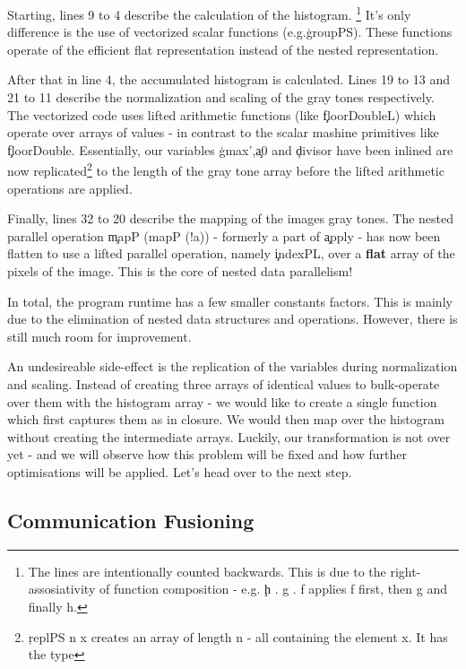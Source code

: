       Starting, lines 9 to 4 describe the calculation of the histogram.
      \footnote[1]{The lines are intentionally counted backwards. This is due to the right-assosiativity of function composition - e.g. \c{h . g . f} applies f first, then g and finally h.}
      It's only difference is the use of vectorized scalar functions (e.g.\c{groupPS}). These functions operate of the efficient flat
      representation instead of the nested representation.
      
      
      After that in line 4, the accumulated histogram is calculated. Lines 19 to 13 and 21 to 11
      describe the normalization and scaling of the gray tones respectively. The vectorized code uses
      lifted arithmetic functions (like \c{floorDoubleL}) which operate over arrays of values - in contrast to
      the scalar mashine primitives like \c{floorDouble}. Essentially, our variables \c{gmax'},\c{a0} and \c{divisor}
      have been inlined are now replicated\footnote[2]{\c{replPS n x} creates an array of length n - all containing the element x. It has the type }
      to the length of the gray tone array before the lifted arithmetic operations are applied.
      
      
      Finally, lines 32 to 20 describe the mapping of the images gray tones.
      The nested parallel operation \c{mapP (mapP (!a))} - formerly a part of \c{apply} - 
      has now been flatten to use a lifted parallel operation, namely \c{indexPL}, over a \textbf{flat} array of
      the pixels of the image. This is the core of nested data parallelism!
      
      In total, the program runtime has a few smaller constants factors. This is mainly due to the elimination of nested data structures
      and operations. However, there is still much room for improvement.
      
      An undesireable side-effect
      is the replication of the variables during normalization and scaling. Instead of creating three arrays of identical values
      to bulk-operate over them with the histogram array - we would like to create a single function which first
      captures them as in closure. We would then map over the histogram without creating the intermediate arrays.
      Luckily, our transformation is not over yet - and we will observe how this problem will be fixed and how further optimisations will be applied.
      Let's head over to the next step.
      
    \subsection{Communication Fusioning}
      
